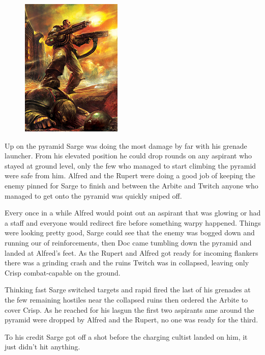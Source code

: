 \begin{figure}
	\begin{center}
		\includegraphics[width=\figwidth]{pics/6/43.png}
	\end{center}
\end{figure}
Up on the pyramid Sarge was doing the most damage by far with his grenade launcher. 
From his elevated position he could drop rounds on any aspirant who stayed at ground level, only the few who managed to start climbing the pyramid were safe from him. 
Alfred and the Rupert were doing a good job of keeping the enemy pinned for Sarge to finish and between the Arbite and Twitch anyone who managed to get onto the pyramid was quickly sniped off.

Every once in a while Alfred would point out an aspirant that was glowing or had a staff and everyone would redirect fire before something warpy happened. 
Things were looking pretty good, Sarge could see that the enemy was bogged down and running our of reinforcements, then Doc came tumbling down the pyramid and landed at Alfred's feet. 
As the Rupert and Alfred got ready for incoming flankers there was a grinding crash and the ruins Twitch was in collapsed, leaving only Crisp combat-capable on the ground.

Thinking fast Sarge switched targets and rapid fired the last of his grenades at the few remaining hostiles near the collapsed ruins then ordered the Arbite to cover Crisp. 
As he reached for his lasgun the first two aspirants ame around the pyramid were dropped by Alfred and the Rupert, no one was ready for the third.

To his credit Sarge got off a shot before the charging cultist landed on him, it just didn't hit anything.

